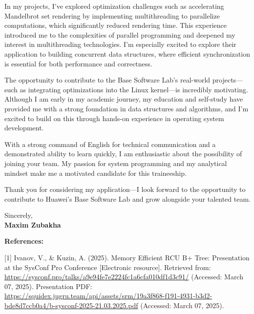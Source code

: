 \documentclass[11pt]{report}
\begin{document}
\begin{titlepage}
\begin{large}
\vspace{0.7em}

In my projects, I’ve explored optimization challenges such as accelerating Mandelbrot set rendering by implementing multithreading to parallelize computations, which significantly reduced rendering time. This experience introduced me to the complexities of parallel programming and deepened my interest in multithreading technologies. I’m especially excited to explore their application to building concurrent data structures, where efficient synchronization is essential for both performance and correctness.

\vspace{0.7em}

The opportunity to contribute to the Base Software Lab’s real-world projects—such as integrating optimizations into the Linux kernel—is incredibly motivating. Although I am early in my academic journey, my education and self-study have provided me with a strong foundation in data structures and algorithms, and I’m excited to build on this through hands-on experience in operating system development.

\vspace{0.7em}

With a strong command of English for technical communication and a demonstrated ability to learn quickly, I am enthusiastic about the possibility of joining your team. My passion for system programming and my analytical mindset make me a motivated candidate for this traineeship.

\vspace{0.7em}

Thank you for considering my application—I look forward to the opportunity to contribute to Huawei’s Base Software Lab and grow alongside your talented team.

\vspace{0.7em}

\raggedright Sincerely,\\
\textbf{Maxim Zubakha}

\vspace{1.0em}

\textbf{References:} \\
\vspace{0.2em}

[1] Ivanov, V., \& Kuzin, A. (2025). Memory Efficient RCU B+ Tree: Presentation at the SysConf Pro Conference [Electronic resource]. Retrieved from: \href{https://sysconf.pro/talks/a9e94fe7e2224fc1a6cfa010df1d3c91/}{https://sysconf.pro/talks/a9e94fe7e2224fc1a6cfa010df1d3c91/} (Accessed: March 07, 2025). Presentation PDF: \href{https://squidex.jugru.team/api/assets/srm/19a3f868-f191-4931-b3d2-bde8d7ccb0a4/b-sysconf-2025-21.03.2025.pdf}{https://squidex.jugru.team/api/assets/srm/19a3f868-f191-4931-b3d2-bde8d7ccb0a4/b-sysconf-2025-21.03.2025.pdf} (Accessed: March 07, 2025).

\end{large}

\end{titlepage}
\end{document}
